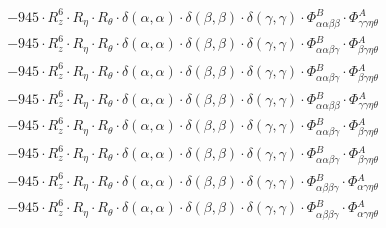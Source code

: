 \documentclass{article}
\begin{document}
\begin{subequations}
\begin{gather}
\begin{array}{c}
 \\[0.2em] 		 - 945 \cdot R_{z}^{6} \cdot R_{\eta{}} \cdot R_{\theta{}} \cdot \delta{}\left(\alpha{}, \alpha{}\right) \cdot \delta{}\left(\beta{}, \beta{}\right) \cdot \delta{}\left(\gamma{}, \gamma{}\right) \cdot \Phi{}^{B}_{\alpha{}\alpha{}\beta{}\beta{}} \cdot \Phi{}^{A}_{\gamma{}\gamma{}\eta{}\theta{}} 
 \\[0.2em] 		 - 945 \cdot R_{z}^{6} \cdot R_{\eta{}} \cdot R_{\theta{}} \cdot \delta{}\left(\alpha{}, \alpha{}\right) \cdot \delta{}\left(\beta{}, \beta{}\right) \cdot \delta{}\left(\gamma{}, \gamma{}\right) \cdot \Phi{}^{B}_{\alpha{}\alpha{}\beta{}\gamma{}} \cdot \Phi{}^{A}_{\beta{}\gamma{}\eta{}\theta{}} 
 \\[0.2em] 		 - 945 \cdot R_{z}^{6} \cdot R_{\eta{}} \cdot R_{\theta{}} \cdot \delta{}\left(\alpha{}, \alpha{}\right) \cdot \delta{}\left(\beta{}, \beta{}\right) \cdot \delta{}\left(\gamma{}, \gamma{}\right) \cdot \Phi{}^{B}_{\alpha{}\alpha{}\beta{}\gamma{}} \cdot \Phi{}^{A}_{\beta{}\gamma{}\eta{}\theta{}} 
 \\[0.2em] 		 - 945 \cdot R_{z}^{6} \cdot R_{\eta{}} \cdot R_{\theta{}} \cdot \delta{}\left(\alpha{}, \alpha{}\right) \cdot \delta{}\left(\beta{}, \beta{}\right) \cdot \delta{}\left(\gamma{}, \gamma{}\right) \cdot \Phi{}^{B}_{\alpha{}\alpha{}\beta{}\beta{}} \cdot \Phi{}^{A}_{\gamma{}\gamma{}\eta{}\theta{}} 
 \\[0.2em] 		 - 945 \cdot R_{z}^{6} \cdot R_{\eta{}} \cdot R_{\theta{}} \cdot \delta{}\left(\alpha{}, \alpha{}\right) \cdot \delta{}\left(\beta{}, \beta{}\right) \cdot \delta{}\left(\gamma{}, \gamma{}\right) \cdot \Phi{}^{B}_{\alpha{}\alpha{}\beta{}\gamma{}} \cdot \Phi{}^{A}_{\beta{}\gamma{}\eta{}\theta{}} 
 \\[0.2em] 		 - 945 \cdot R_{z}^{6} \cdot R_{\eta{}} \cdot R_{\theta{}} \cdot \delta{}\left(\alpha{}, \alpha{}\right) \cdot \delta{}\left(\beta{}, \beta{}\right) \cdot \delta{}\left(\gamma{}, \gamma{}\right) \cdot \Phi{}^{B}_{\alpha{}\alpha{}\beta{}\gamma{}} \cdot \Phi{}^{A}_{\beta{}\gamma{}\eta{}\theta{}} 
 \\[0.2em] 		 - 945 \cdot R_{z}^{6} \cdot R_{\eta{}} \cdot R_{\theta{}} \cdot \delta{}\left(\alpha{}, \alpha{}\right) \cdot \delta{}\left(\beta{}, \beta{}\right) \cdot \delta{}\left(\gamma{}, \gamma{}\right) \cdot \Phi{}^{B}_{\alpha{}\beta{}\beta{}\gamma{}} \cdot \Phi{}^{A}_{\alpha{}\gamma{}\eta{}\theta{}} 
 \\[0.2em] 		 - 945 \cdot R_{z}^{6} \cdot R_{\eta{}} \cdot R_{\theta{}} \cdot \delta{}\left(\alpha{}, \alpha{}\right) \cdot \delta{}\left(\beta{}, \beta{}\right) \cdot \delta{}\left(\gamma{}, \gamma{}\right) \cdot \Phi{}^{B}_{\alpha{}\beta{}\beta{}\gamma{}} \cdot \Phi{}^{A}_{\alpha{}\gamma{}\eta{}\theta{}} 

\end{array}
\end{gather}
\end{subequations}
\end{document}
